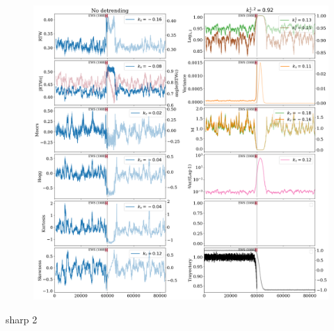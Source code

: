 \begin{figure}
	\centering
	\includegraphics[width=0.7\linewidth]{"Images/Metrics/sharp transition/No_det_additive"}
	\caption{}
	\label{fig:nodetadditive}
\end{figure}

sharp 2
